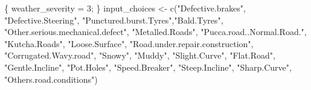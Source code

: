 \documentclass[
]{article}
\newenvironment{Shaded}{\begin{snugshade}}{\end{snugshade}}
\newcommand{\DecValTok}[1]{\textcolor[rgb]{0.00,0.00,0.81}{#1}}
\newcommand{\FunctionTok}[1]{\textcolor[rgb]{0.00,0.00,0.00}{#1}}
\newcommand{\NormalTok}[1]{#1}
\newcommand{\OtherTok}[1]{\textcolor[rgb]{0.56,0.35,0.01}{#1}}
\newcommand{\StringTok}[1]{\textcolor[rgb]{0.31,0.60,0.02}{#1}}
\begin{document}
\begin{Shaded}
\begin{Highlighting}[]
\NormalTok{    \{}
\NormalTok{      weather\_severity }\OtherTok{=} \DecValTok{3}\NormalTok{;}
\NormalTok{    \}}
\NormalTok{    input\_choices }\OtherTok{\textless{}{-}} \FunctionTok{c}\NormalTok{(}\StringTok{"Defective.brakes"}\NormalTok{, }\StringTok{"Defective.Steering"}\NormalTok{, }\StringTok{"Punctured.burst.Tyres"}\NormalTok{,}\StringTok{"Bald.Tyres"}\NormalTok{, }\StringTok{"Other.serious.mechanical.defect"}\NormalTok{, }\StringTok{"Metalled.Roads"}\NormalTok{, }\StringTok{"Pucca.road..Normal.Road."}\NormalTok{, }\StringTok{"Kutcha.Roads"}\NormalTok{, }\StringTok{"Loose.Surface"}\NormalTok{, }\StringTok{"Road.under.repair.construction"}\NormalTok{, }\StringTok{"Corrugated.Wavy.road"}\NormalTok{, }\StringTok{"Snowy"}\NormalTok{, }\StringTok{"Muddy"}\NormalTok{, }\StringTok{"Slight.Curve"}\NormalTok{, }\StringTok{"Flat.Road"}\NormalTok{, }\StringTok{"Gentle.Incline"}\NormalTok{, }\StringTok{"Pot.Holes"}\NormalTok{, }\StringTok{"Speed.Breaker"}\NormalTok{, }\StringTok{"Steep.Incline"}\NormalTok{, }\StringTok{"Sharp.Curve"}\NormalTok{, }\StringTok{"Others.road.conditions"}\NormalTok{)}
    

\end{Highlighting}
\end{Shaded}
\end{document}
